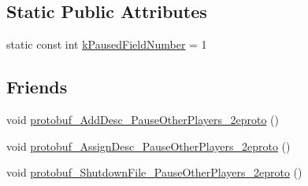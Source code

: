 \subsection*{Static Public Attributes}
\begin{DoxyCompactItemize}
\item 
static const int \hyperlink{class_pause_other_players_ad4f24b6f71dae8934ab680c37f72b144}{k\-Paused\-Field\-Number} = 1
\end{DoxyCompactItemize}
\subsection*{Friends}
\begin{DoxyCompactItemize}
\item 
void \hyperlink{class_pause_other_players_a007eaba79d9840bfe722146d0e1d6b37}{protobuf\-\_\-\-Add\-Desc\-\_\-\-Pause\-Other\-Players\-\_\-2eproto} ()
\item 
void \hyperlink{class_pause_other_players_aeb3f974c8db10b61825844f19af2809a}{protobuf\-\_\-\-Assign\-Desc\-\_\-\-Pause\-Other\-Players\-\_\-2eproto} ()
\item 
void \hyperlink{class_pause_other_players_a0499888e4edae1a466fbed0481ae977b}{protobuf\-\_\-\-Shutdown\-File\-\_\-\-Pause\-Other\-Players\-\_\-2eproto} ()
\end{DoxyCompactItemize}


